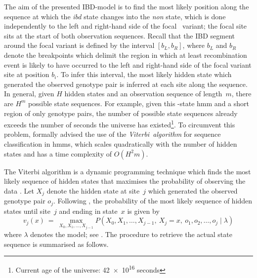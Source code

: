 The aim of the presented IBD-model is to find the most likely position along the sequence at which the \emph{ibd} state changes into the \emph{non} state, which is done independently to the left and right-hand side of the focal \fk{}~variant; \ie the focal site sits at the start of both observation sequences.
Recall that the IBD segment around the focal variant is defined by the interval ${[b_L, b_R]}$, where $b_L$ and $b_R$ denote the breakpoints which delimit the region in which at least  recombination event is likely to have occurred to the left and right-hand side of the focal variant site at position $b_i$.
To infer this interval, the most likely hidden state which generated the observed genotype pair is inferred at each site along the sequence.
In general, given ${H}$ hidden states and an observation sequence of length~$m$, there are $H^m$ possible state sequences.
For example, given this -state \gls{hmm} and a short region of only  genotype pairs, the number of possible state sequences already exceeds the number of seconds the universe has existed\footnote{Current age of the universe: \num{42e16} seconds }.
To circumvent this problem, \citet{Rabiner:1989hs} formally advised the use of the \emph{Viterbi~algorithm} for sequence classification in \glspl{hmm}, which scales quadratically with the number of hidden states and has a time complexity of ${O(H^2 m)}$.

%
%

The Viterbi algorithm is a dynamic programming technique which finds the most likely sequence of hidden states that maximises the probability of observing the data \citep{Viterbi:1967hq,Forney:1973dt}.
Let $X_j$ denote the hidden state at site~$j$ which generated the observed genotype pair $o_j$.
Following \citet{Rabiner:1989hs}, the probability of the most likely sequence of hidden states until site~$j$ and ending in state~$x$ is given by
\begin{equation}\label{eq:viterbi_main}
	v_j(x) ~=~ \max_{X_0, X_1, \ldots, X_{j-1}} P(X_0, X_1, \ldots, X_{j-1},~ X_j = x,~ o_1, o_2, \ldots, o_j \mid \lambda)
\end{equation}
where $\lambda$ denotes the model; see .
The procedure to retrieve the actual state sequence is summarised as follows.


